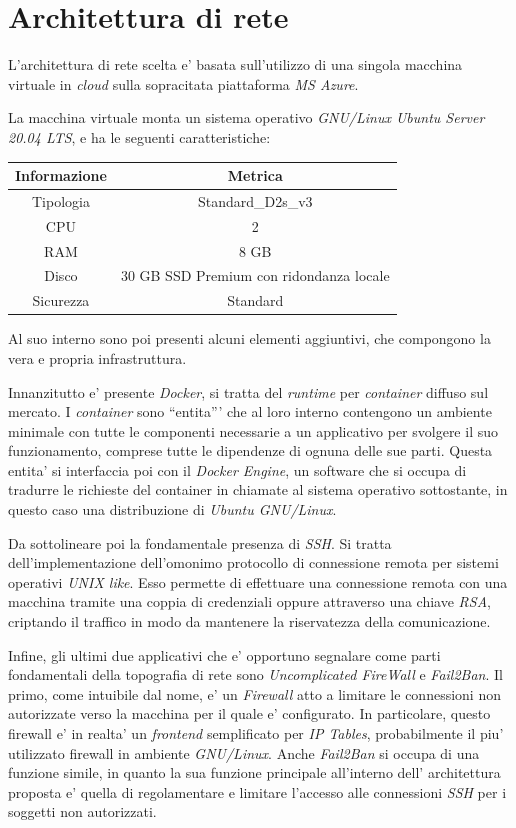 \documentclass[a4paper]{report}
\newcommand{\quotes}[1]{``#1''}
\begin{document}
	\section{Architettura di rete}\label{architettura_di_rete}
		L'architettura di rete scelta e' basata sull'utilizzo di una singola macchina virtuale in \emph{cloud} sulla
		sopracitata piattaforma \emph{MS Azure}.

		La macchina virtuale monta un sistema operativo \emph{GNU/Linux Ubuntu Server 20.04 LTS}, e ha le seguenti
		caratteristiche:
		\begin{center}
			\begin{tabular}{c c}
				Informazione & Metrica \\
				\midrule
				Tipologia & Standard\_D2s\_v3 \\
				CPU & 2 \\
				RAM & 8 GB \\
				Disco & 30 GB SSD Premium con ridondanza locale \\
				Sicurezza & Standard \\
			\end{tabular}
		\end{center}

		Al suo interno sono poi presenti alcuni elementi aggiuntivi, che compongono la vera e propria infrastruttura.

		Innanzitutto e' presente \emph{Docker}, si tratta del \emph{runtime} per \emph{container} diffuso
		sul mercato. I \emph{container} sono \quotes{entita'} che al loro interno contengono un ambiente minimale con
		tutte le componenti necessarie a un applicativo per svolgere il suo funzionamento, comprese tutte le dipendenze
		di ognuna delle sue parti. Questa entita' si interfaccia poi con il \emph{Docker Engine}, un software che si
		occupa di tradurre le richieste del container in chiamate al sistema operativo sottostante, in questo caso una
		distribuzione di \emph{Ubuntu GNU/Linux}.

		Da sottolineare poi la fondamentale presenza di \emph{SSH}\label{SSH}. Si tratta dell'implementazione
		dell'omonimo protocollo di connessione remota per sistemi operativi \emph{UNIX like}. Esso permette di
		effettuare una connessione remota con una macchina tramite una coppia di credenziali oppure attraverso una chiave
		\emph{RSA}, criptando il traffico in modo da mantenere la riservatezza della comunicazione.

		Infine, gli ultimi due applicativi che e' opportuno segnalare come parti fondamentali della topografia di rete
		sono \emph{Uncomplicated FireWall} e \emph{Fail2Ban}. Il primo, come intuibile dal nome, e' un \emph{Firewall}
		atto a limitare le connessioni non autorizzate verso la macchina per il quale e' configurato. In particolare,
		questo firewall e' in realta' un \emph{frontend} semplificato per \emph{IP Tables}, probabilmente il piu'
		utilizzato firewall in ambiente \emph{GNU/Linux}.
		Anche \emph{Fail2Ban} si occupa di una funzione simile, in quanto la sua funzione principale all'interno dell'
		architettura proposta e' quella di regolamentare e limitare l'accesso alle connessioni \emph{SSH} per i soggetti
		non autorizzati.
\end{document}
